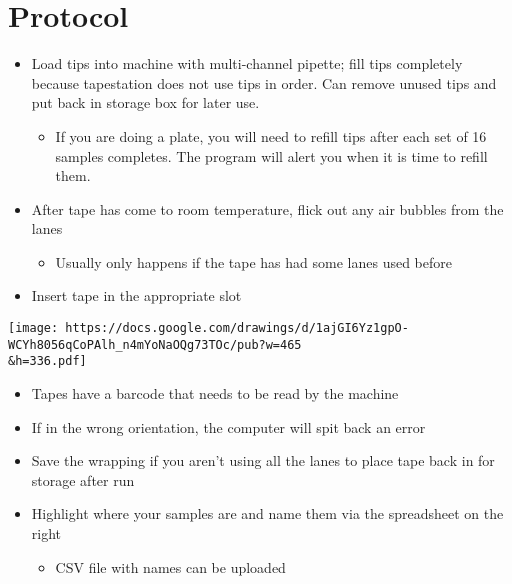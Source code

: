 \documentclass[
  letterpaper,
  DIV=11,
  numbers=noendperiod]{scrreprt}
\providecommand{\tightlist}{%
  \setlength{\itemsep}{0pt}\setlength{\parskip}{0pt}}\usepackage{longtable,booktabs,array}
\begin{document}
\hypertarget{protocol-6}{%
\section*{\texorpdfstring{\textbf{Protocol}}{Protocol}}\label{protocol-6}}

\begin{itemize}
\item
  Load tips into machine with multi-channel pipette; fill tips
  completely because tapestation does not use tips in order. Can remove
  unused tips and put back in storage box for later use.

  \begin{itemize}
  \tightlist
  \item
    If you are doing a plate, you will need to refill tips after each
    set of 16 samples completes. The program will alert you when it is
    time to refill them.
  \end{itemize}
\item
  After tape has come to room temperature, flick out any air bubbles
  from the lanes

  \begin{itemize}
  \tightlist
  \item
    Usually only happens if the tape has had some lanes used before
  \end{itemize}
\item
  Insert tape in the appropriate slot
\end{itemize}

\texttt{[image: https://docs.google.com/drawings/d/1ajGI6Yz1gpO-WCYh8056qCoPAlh\_n4mYoNaOQg73TOc/pub?w=465\\\&h=336.pdf]}

\begin{itemize}
\item
  Tapes have a barcode that needs to be read by the machine
\item
  If in the wrong orientation, the computer will spit back an error
\item
  Save the wrapping if you aren't using all the lanes to place tape back
  in for storage after run
\item
  Highlight where your samples are and name them via the spreadsheet on
  the right

  \begin{itemize}
  \tightlist
  \item
    CSV file with names can be uploaded
  \end{itemize}
\end{itemize}
\end{document}
